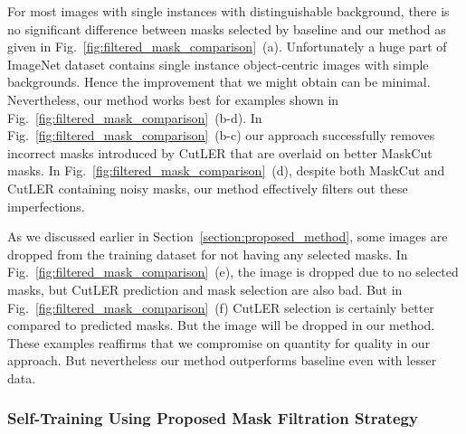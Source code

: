 For most images with single instances with distinguishable background, there is no significant difference between masks selected by baseline and our method as given in Fig.~\ref{fig:filtered_mask_comparison}~(a). Unfortunately a huge part of ImageNet dataset contains single instance object-centric images with simple backgrounds. Hence the improvement that we might obtain can be minimal. Nevertheless, our method works best for examples shown in Fig.~\ref{fig:filtered_mask_comparison}~(b-d). In Fig.~\ref{fig:filtered_mask_comparison}~(b-c) our approach successfully removes incorrect masks introduced by CutLER that are overlaid on better MaskCut masks. In Fig.~\ref{fig:filtered_mask_comparison}~(d), despite both MaskCut and CutLER containing noisy masks, our method effectively filters out these imperfections.

As we discussed earlier in Section~\ref{section:proposed_method}, some images are dropped from the training dataset for not having any selected masks. In Fig.~\ref{fig:filtered_mask_comparison}~(e), the image is dropped due to no selected masks, but CutLER prediction and mask selection are also bad. But in Fig.~\ref{fig:filtered_mask_comparison}~(f) CutLER selection is certainly better compared to predicted masks. But the image will be dropped in our method. These examples reaffirms that we compromise on quantity for quality in our approach. But nevertheless our method outperforms baseline even with lesser data.

\subsubsection{Self-Training Using Proposed Mask Filtration Strategy}

\begin{table}[htbp]
	\centering
	\caption[\textbf{\(AP_{box}\) and \(AP50_{box}\) for Training and First Self-Training Round}]{\textbf{\(AP_{box}\) and \(AP50_{box}\) for Training and Self-Training} evaluated on COCO validation set (Batch size 8) for model trained using our mask filtration for self-training}
	\label{tab:combined_train_and_r1}
\end{table}

